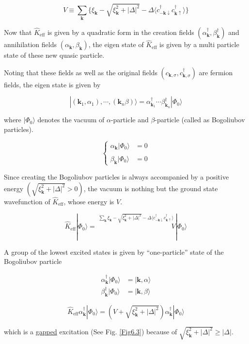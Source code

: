 \[V \equiv\sum_{\bm{k}}\{\xi_{\bm{k}}-\sqrt{\xi_{\bm{k}}^2+|\Delta|^2}-\Delta\langle c_{-\bm{k}\downarrow}^\dagger c_{\bm{k}\uparrow}^\dagger\rangle\} \]

Now that $\hat{K}_{\text{eff}}$ is given by a quadratic form in the creation fields $(\alpha_{\bm{k}}^\dagger, \beta_{\bm{k}}^\dagger)$ and annihilation fields $(\alpha_{\bm{k}}, \beta_{\bm{k}})$, the eigen state of $\hat{K}_{\text{eff}}$ is given by a multi particle state of these new quasic particle. 

Noting that these fields as well as the original fields $(c_{\bm{k},\sigma}, c_{\bm{k},\sigma}^\dagger)$ are fermion fields, the eigen state is given by 

\[|(\bm{k}_1,\alpha_1),\cdots,(\bm{k}_n\beta)\rangle = \alpha_{\bm{k}_1}^\dagger \cdots \beta_{\bm{k}_n}^\dagger|\Phi_0\rangle \]

where $|\Phi_0\rangle$ denotes the vacuum of $\alpha$-particle and $\beta$-particle (called as Bogoliubov particles). 

\[\begin{cases}
\alpha_{\bm{k}}|\Phi_0\rangle &= 0\\
\ & \ \\
\beta_{\bm{k}}|\Phi_0\rangle &= 0
\end{cases}\]

Since creating the Bogoliubov particles is always accompanied by a positive energy $(\sqrt{\xi_{\bm{k}}^2+|\Delta|^2}>0)$, the vacuum is nothing but the ground state wavefunction of $\hat{K}_{\text{eff}}$, whose energy is $V$. 

\[\hat{K}_{\text{eff}}|\Phi_0\rangle = \overset{\sum_{\bm{k}}\xi_{\bm{k}}-\sqrt{\xi_{\bm{k}}^2+|\Delta|^2}-\Delta\langle c_{-\bm{k}\downarrow}^\dagger c_{\bm{k}\uparrow}^\dagger\rangle}{\quad\quad\quad\quad\quad\quad\quad\quad\quad\quad\quad V}|\Phi_0\rangle \]

A group of the lowest excited states is given by ``one-particle'' state of the Bogoliubov particle

\[\begin{split}
\alpha_{\bm{k}}^\dagger|\Phi_0\rangle &= |\bm{k},\alpha\rangle\\
\beta_{\bm{k}}^\dagger|\Phi_0\rangle &= |\bm{k}, \beta\rangle
\end{split}\]

\[\hat{K}_{\text{eff}} \alpha_{\bm{k}}^\dagger|\Phi_0\rangle = (V+\sqrt{\xi_{\bm{k}}^2+|\Delta|^2})\alpha_{\bm{k}}^\dagger|\Phi_0\rangle \]

which is a \uline{gapped} excitation (See Fig. \ref{Fig6.3}) because of $\sqrt{\xi_{\bm{k}}^2+|\Delta|^2}\ge|\Delta|$. 

